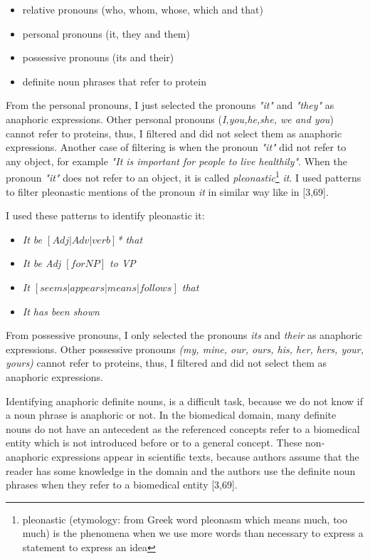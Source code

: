 \begin{itemize}
	\item relative pronouns (who, whom, whose, which and that)
	\item personal pronouns (it, they and them)
	\item possessive pronouns (its and their)
	\item definite noun phrases that refer to protein 
\end{itemize}

From the personal pronouns, I just selected the pronouns \emph{"it"} and \emph{"they"} as anaphoric expressions. Other personal pronouns (\emph{I,you,he,she, we and you}) cannot refer to proteins, thus, I filtered and did not select them as anaphoric expressions. Another case of filtering is when the pronoun \emph{"it"} did not refer to any object, for example \emph{"It is important for people to live healthily"}. When the pronoun \emph{"it"} does not refer to an object, it is called \emph{pleonastic}\footnote{ pleonastic (etymology: from Greek word pleonasm which means much, too much) is the phenomena when we use more words than necessary to express a statement to express an idea} \emph{it}. I used patterns to filter pleonastic mentions of the pronoun \emph{it} in similar way like in [3,69]. 

I used these patterns to identify pleonastic it:

\begin{itemize}
	\item \emph{It be $[Adj | Adv | verb]$* that}
	\item \emph{It be Adj $[for NP]$ to VP}
	\item \emph{It $[seems | appears | means | follows]$ that} 
	\item \emph{It has been shown}
\end{itemize}

From possessive pronouns, I only selected the pronouns \emph{its} and \emph{their} as anaphoric expressions. Other possessive pronouns \emph{(my, mine, our, ours, his, her, hers, your, yours)} cannot refer to proteins, thus, I filtered and did not select them as anaphoric expressions.

Identifying anaphoric definite nouns, is a difficult task, because we do not know if a noun phrase is anaphoric or not. In the biomedical domain, many definite nouns do not have an antecedent as the referenced concepts refer to a biomedical entity which is not introduced before or to a general concept. These non-anaphoric expressions appear in scientific texts, because authors assume that the reader has some knowledge in the domain and the authors use the definite noun phrases when they refer to a biomedical entity [3,69]. 

